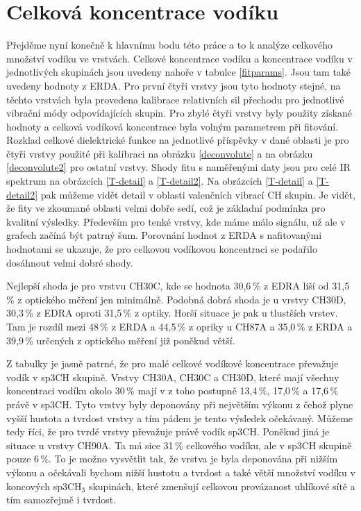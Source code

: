 \section{Celková koncentrace vodíku}
Přejděme nyní konečně k hlavnímu bodu této práce a to k analýze celkového množství vodíku ve vrstvách. Celkové koncentrace vodíku a koncentrace vodíku v jednotlivých skupinách jsou uvedeny nahoře v tabulce \ref{fitparams}. 
Jsou tam také uvedeny hodnoty z ERDA. Pro první čtyři vrstvy jsou tyto hodnoty stejné, na těchto vrstvách byla provedena kalibrace relativních sil přechodu pro jednotlivé vibrační módy odpovídajících skupin. 
Pro zbylé čtyři vrstvy byly použity získané hodnoty a celková vodíková koncentrace byla volným parametrem při fitování. Rozklad celkové dielektrické funkce na jednotlivé příspěvky v dané oblasti je pro čtyři vrstvy použité při kalibraci na obrázku \ref{deconvolute} a na obrázku \ref{deconvolute2} pro ostatní vrstvy. 
Shody fitu s naměřenými daty jsou pro celé IR spektrum na obrázcích \ref{T-detail} a \ref{T-detail2}. Na obrázcích \ref{T-detail} a \ref{T-detail2} pak můžeme vidět detail v oblasti valenčních vibrací CH skupin. Je vidět, že fity ve zkoumané oblasti velmi dobře sedí, což je základní podmínka pro kvalitní výsledky. Především pro tenké vrstvy, kde máme málo signálu, už ale v grafech začíná být patrný šum.  
Porovnání hodnot z ERDA s nafitovanými hodnotami se ukazuje, že pro celkovou vodíkovou koncentraci se podařilo dosáhnout velmi dobré shody.

Nejlepší shoda je pro vrstvu CH30C, kde se hodnota 30,6\,\% z EDRA liší od 31,5\,\% z optického měření jen minimálně. Podobná dobrá shoda je u vrstvy CH30D, 30,3\,\% z EDRA oproti 31,5\,\% z optiky. Horší situace je pak u tlustších vrstev. Tam je rozdíl mezi 48\,\% z ERDA a 44,5\,\% z opriky u CH87A a 35,0\,\% z ERDA a 39,9\,\% určených z optického měření již poněkud větší.

Z tabulky je jasně patrné, že pro malé celkové vodíkové koncentrace převažuje vodík v sp3CH skupině. Vrstvy CH30A, CH30C a CH30D, které mají všechny koncentraci vodíku okolo 30\,\% mají v z toho postupně 13,4\,\%, 17,0\,\% a 17,6\,\% právě v sp3CH. Tyto vrstvy byly deponovány při největším výkonu z čehož plyne vyšší hustota a tvrdost vrstvy a tím pádem je tento výsledek očekávaný. 
Můžeme tedy říci, že pro tvrdé vrstvy převažuje právě vodík sp3CH. Poněkud jiná je situace u vrstvy CH90A. Ta má sice 31\,\% celkového vodíku, ale v sp3CH skupině pouze 6\,\%. To je možno vysvětlit tak, že vrstva je byla deponována při nižším výkonu a očekávali bychom nižší hustotu a tvrdost a také větší množství vodíku v koncových sp3CH$_3$ skupinách, které zmenšují celkovou provázanost uhlíkové sítě a tím samozřejmě i tvrdost. 

